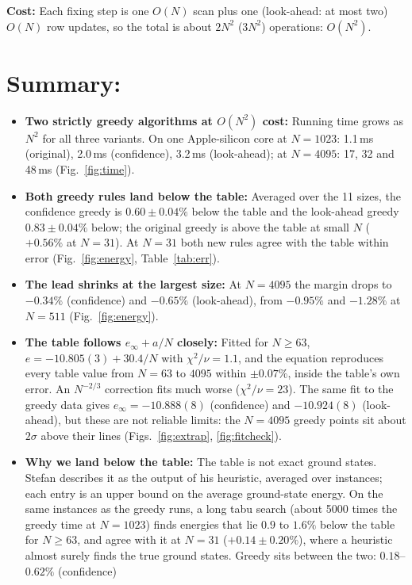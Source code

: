 \documentclass[11pt]{article}
\begin{document}
\noindent\textbf{Cost:} Each fixing step is one $O(N)$ scan plus one (look-ahead: at most two) $O(N)$ row updates,
so the total is about $2N^2$ ($3N^2$) operations: $O(N^2)$.

\section*{Summary:}
\begin{itemize}[nosep]
  \item \textbf{Two strictly greedy algorithms at $O(N^2)$ cost:} Running time grows as $N^2$ for all three variants.
  On one Apple-silicon core at $N = 1023$: 1.1\,ms (original), 2.0\,ms (confidence), 3.2\,ms (look-ahead); at
  $N=4095$: 17, 32 and 48\,ms (Fig.~\ref{fig:time}).
  \item \textbf{Both greedy rules land below the table:} Averaged over the 11 sizes, the confidence greedy is
  $0.60 \pm 0.04\%$ below the table and the look-ahead greedy $0.83 \pm 0.04\%$ below; the original greedy is above
  the table at small $N$ ($+0.56\%$ at $N=31$). At $N = 31$ both new rules agree with the table within error
  (Fig.~\ref{fig:energy}, Table~\ref{tab:err}).
  \item \textbf{The lead shrinks at the largest size:} At $N = 4095$ the margin drops to $-0.34\%$ (confidence) and
  $-0.65\%$ (look-ahead), from $-0.95\%$ and $-1.28\%$ at $N = 511$ (Fig.~\ref{fig:energy}).
  \item \textbf{The table follows $e_\infty + a/N$ closely:} Fitted for $N \ge 63$, $e = -10.805(3) + 30.4/N$ with
  $\chi^2/\nu = 1.1$, and the equation reproduces every table value from $N = 63$ to $4095$ within $\pm0.07\%$, inside
  the table's own error. An $N^{-2/3}$ correction fits much worse ($\chi^2/\nu = 23$). The same fit to the greedy data
  gives $e_\infty = -10.888(8)$ (confidence) and $-10.924(8)$ (look-ahead), but these are not reliable limits: the
  $N = 4095$ greedy points sit about $2\sigma$ above their lines (Figs.~\ref{fig:extrap}, \ref{fig:fitcheck}).
  \item \textbf{Why we land below the table:} The table is not exact ground states. Stefan describes it as the output of
  his heuristic, averaged over instances; each entry is an upper bound on the average ground-state energy. On the same
  instances as the greedy runs, a long tabu search (about 5000 times the greedy time at $N=1023$) finds energies that
  lie $0.9$ to $1.6\%$ below the table for $N \ge 63$, and agree with it at $N = 31$ ($+0.14 \pm 0.20\%$), where a
  heuristic almost surely finds the true ground states. Greedy sits between the two: $0.18$--$0.62\%$ (confidence)

\end{itemize}
\end{document}
